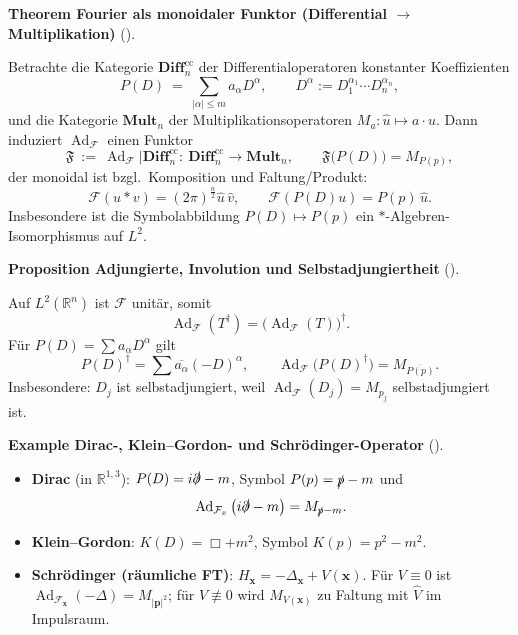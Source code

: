 \documentclass[10pt, letterpaper]{article}
\newcommand{\Ad}{\operatorname{Ad}}
\newcommand{\R}{\mathbb{R}}
\newcommand{\CustomHeading}[3]{%
  \par\medskip\noindent%
  \textbf{#1 #2} \textnormal{(#3)}.\enskip%
}
\newenvironment{PROP}[2]{\begin{unitbox}\CustomHeading{Proposition}{#1}{#2}}{\end{unitbox}}
\newenvironment{THEO}[2]{\begin{unitbox}\CustomHeading{Theorem}{#1}{#2}}{\end{unitbox}}
\newenvironment{EXA}[2]{\begin{unitbox}\CustomHeading{Example}{#1}{#2}}{\end{unitbox}}
\begin{document}
\begin{THEO}{Fourier als monoidaler Funktor (Differential $\to$ Multiplikation)}{}
Betrachte die Kategorie $\mathbf{Diff}^{\mathrm{cc}}_n$ der Differentialoperatoren konstanter Koeffizienten
\[
P(D)\ =\ \sum_{|\alpha|\le m}a_\alpha D^\alpha,\qquad D^\alpha:=D_1^{\alpha_1}\cdots D_n^{\alpha_n},
\]
und die Kategorie $\mathbf{Mult}_n$ der Multiplikationsoperatoren $M_a:\hat u\mapsto a\cdot \hat u$.
Dann induziert $\Ad_{\mathcal{F}}$ einen Funktor
\[
\mathfrak{F}\ :=\ \Ad_{\mathcal{F}}\big|\mathbf{Diff}^{\mathrm{cc}}_n:\ 
\mathbf{Diff}^{\mathrm{cc}}_n\longrightarrow \mathbf{Mult}_n,\qquad
\mathfrak{F}\big(P(D)\big)=M_{P(p)},
\]
der monoidal ist bzgl.\ Komposition und Faltung/Produkt:
\[
\mathcal{F}(u*v)=(2\pi)^{\frac{n}{2}}\hat u\,\hat v,\qquad
\mathcal{F}(P(D)u)=P(p)\,\hat u.
\]
Insbesondere ist die Symbolabbildung $P(D)\mapsto P(p)$ ein $\ast$-Algebren-Isomorphismus auf $L^2$.
\end{THEO}




\begin{PROP}{Adjungierte, Involution und Selbstadjungiertheit}{}
Auf $L^2(\R^n)$ ist $\mathcal{F}$ unitär, somit
\[
\Ad_{\mathcal{F}}(T^\dagger)=\big(\Ad_{\mathcal{F}}(T)\big)^\dagger.
\]
Für $P(D)=\sum a_\alpha D^\alpha$ gilt
\[
P(D)^\dagger=\sum \overline{a_\alpha}(-D)^\alpha,\qquad
\Ad_{\mathcal{F}}\big(P(D)^\dagger\big)=M_{\overline{P(p)}}.
\]
Insbesondere: $D_j$ ist selbstadjungiert, weil $\Ad_{\mathcal{F}}(D_j)=M_{p_j}$ selbstadjungiert ist.
\end{PROP}




\begin{EXA}{Dirac-, Klein–Gordon- und Schrödinger-Operator}{}
\begin{itemize}
\item \textbf{Dirac} (in $\R^{1,3}$): $P(D)=i\slashed{\partial}-m$, Symbol $P(p)=\slashed{p}-m$ und
\[
\Ad_{\mathcal{F}_x}\big(i\slashed{\partial}-m\big)=M_{\slashed{p}-m}.
\]
\item \textbf{Klein–Gordon}: $K(D)=\Box+m^2$, Symbol $K(p)=p^2-m^2$.
\item \textbf{Schrödinger (räumliche FT)}: $H_{\mathbf{x}}=-\Delta_{\mathbf{x}}+V(\mathbf{x})$.
Für $V\equiv 0$ ist $\Ad_{\mathcal{F}_{\mathbf{x}}}(-\Delta)=M_{|\mathbf{p}|^2}$; für $V\not\equiv0$ wird $M_{V(\mathbf{x})}$ zu Faltung mit $\widehat{V}$ im Impulsraum.
\end{itemize}
\end{EXA}
\end{document}
